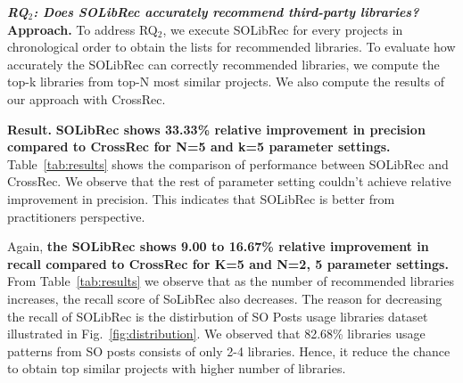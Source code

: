 \documentclass[paper]{ieice}
\newcommand{\RqTwo}{\textbf{RQ$_2$: Does SOLibRec accurately recommend third-party libraries?}}
\begin{document}
\noindent\textit{\RqTwo}\\

\noindent\textbf{Approach.} To address RQ$_2$, we execute SOLibRec for every projects in chronological order to obtain the lists for recommended libraries. To evaluate how accurately the SOLibRec can correctly recommended libraries, we compute the top-k libraries from top-N most similar projects. We also compute the results of our approach with CrossRec.\\


\begin{table}[]
\caption{Performance comparison of SOLibRec and CrossRec}
\label{tab:results}
\end{table}

\noindent\textbf{Result.} \textbf{SOLibRec shows 33.33\% relative improvement in precision compared to CrossRec for N=5 and k=5 parameter settings.} Table~\ref{tab:results} shows the comparison of performance between SOLibRec and CrossRec. We observe that the rest of parameter setting couldn't achieve relative improvement in precision. This indicates that SOLibRec is better from practitioners perspective.

Again, \textbf{the SOLibRec shows 9.00 to 16.67\% relative improvement in recall compared to CrossRec for K=5 and N=2, 5 parameter settings.} From Table~\ref{tab:results} we observe that as the number of recommended libraries increases, the recall score of SoLibRec also decreases. The reason for decreasing the recall of SOLibRec is the distirbution of SO Posts usage libraries dataset illustrated in Fig.~\ref{fig:distribution}. We observed that 82.68\% libraries usage patterns from SO posts consists of only 2-4 libraries. Hence, it reduce the chance to obtain top similar projects with higher number of libraries.
\end{document}
